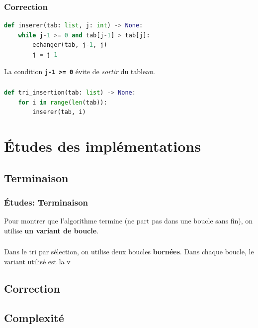 \documentclass[svgnames,11pt]{beamer}
\begin{document}
\begin{frame}[fragile]
    \frametitle{Correction}

\begin{center}
\begin{lstlisting}[language=Python , basicstyle=\ttfamily\small, xleftmargin=2em, xrightmargin=0em]
def inserer(tab: list, j: int) -> None:
    while j-1 >= 0 and tab[j-1] > tab[j]:
        echanger(tab, j-1, j)
        j = j-1
\end{lstlisting}
\end{center}
\begin{aretenir}[Remarque]
La condition \textbf{\texttt{j-1 >= 0}} évite de \emph{sortir} du tableau.
\end{aretenir}
\end{frame}
\begin{frame}[fragile]
    \frametitle{}

\begin{center}
\begin{lstlisting}[language=Python , basicstyle=\ttfamily\small, xleftmargin=2em, xrightmargin=0em]
def tri_insertion(tab: list) -> None:
    for i in range(len(tab)):
        inserer(tab, i)
\end{lstlisting}
\end{center}

\end{frame}
\section{Études des implémentations}
\subsection{Terminaison}
\begin{frame}
    \frametitle{Études: Terminaison}

\begin{aretenir}[]
Pour montrer que l'algorithme termine (ne part pas dans une boucle sans fin), on utilise \textbf{un variant de boucle}.
\end{aretenir}

\end{frame}
\begin{frame}
    \frametitle{}

    Dans le tri par sélection, on utilise deux boucles \textbf{bornées}. Dans chaque boucle, le variant utilisé est la v

\end{frame}
\subsection{Correction}
\subsection{Complexité}
\end{document}
